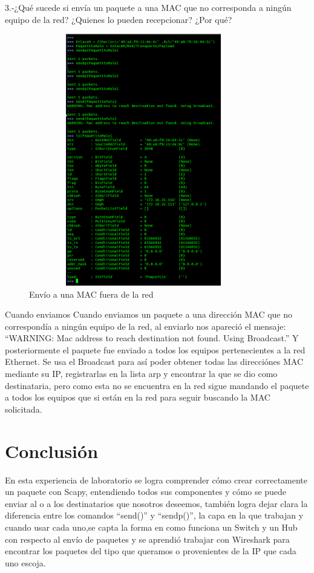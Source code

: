 \documentclass{udpreport}
\begin{document}
  	  3.-¿Qué sucede si envía un paquete a una MAC que no corresponda a ningún equipo
  	      de la red? ¿Quienes lo pueden recepcionar? ¿Por qué?\\
    		\begin{figure}[H]
  	        	\centering
  	          	\includegraphics[width=10cm,height=11cm]{EnvioPaquetitoMalo.png}
  	        	\caption{Envío a una MAC fuera de la red}
  	        \end{figure}
 	      Cuando enviamos 
 	      Cuando enviamos un paquete a una dirección MAC que no correspondía a ningún equipo de la red, al enviarlo nos apareció
 	      el mensaje: “WARNING: Mac address to reach destination not found. Using Broadcast.” Y posteriormente el paquete fue
 	      enviado a todos los equipos pertenecientes a la red Ethernet. Se usa el Broadcast para así poder obtener todas las
 	      direcciónes MAC mediante su IP, registrarlas en la lista arp y encontrar la que se dio como destinataria, pero como esta
 	      no se encuentra en la red sigue mandando el paquete a todos los equipos que si están en la red para seguir buscando la
 	      MAC solicitada.\\

 	     
	      

\chapter{Conclusión}
  	      En esta experiencia de laboratorio se logra comprender cómo crear correctamente un paquete con Scapy,
  	      entendiendo todos sus componentes y cómo se puede enviar al o a los destinatarios que nosotros deseemos, también
  	      logra dejar clara la diferencia entre los comandos “send()” y “sendp()”, la capa en la que trabajan y cuando usar cada
  	      uno,se capta la forma en como funciona un Switch y un Hub con respecto al envío de paquetes y se aprendió trabajar con
  	      Wireshark para encontrar los paquetes del tipo que queramos o provenientes de la IP que cada uno  escoja.
\begin{thebibliography}{x}

\end{thebibliography}
\end{document}

